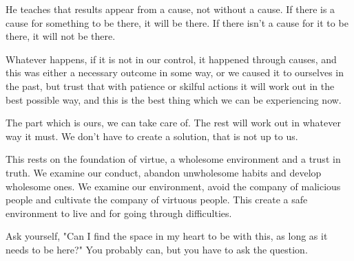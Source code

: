 He teaches that results appear from a cause, not without a cause. If
there is a cause for something to be there, it will be there. If there
isn't a cause for it to be there, it will not be there.

Whatever happens, if it is not in our control, it happened through
causes, and this was either a necessary outcome in some way, or we
caused it to ourselves in the past, but trust that with patience or
skilful actions it will work out in the best possible way, and this is
the best thing which we can be experiencing now.

The part which is ours, we can take care of. The rest will work out in
whatever way it must. We don't have to create a solution, that is not up
to us.

This rests on the foundation of virtue, a wholesome environment and a
trust in truth. We examine our conduct, abandon unwholesome habits and
develop wholesome ones. We examine our environment, avoid the company of
malicious people and cultivate the company of virtuous people. This
create a safe environment to live and for going through difficulties.

Ask yourself, "Can I find the space in my heart to be with this, as long
as it needs to be here?" You probably can, but you have to ask the
question.
